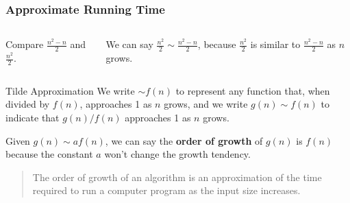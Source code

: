 \documentclass[aspectratio=169, 14pt]{beamer}
\begin{document}
\begin{frame}[fragile]
    \frametitle{Approximate Running Time}

    \begin{columns}
        Compare $\frac{n^2 - n}{2}$ and $\frac{n^2}{2}$.
        
        We can say \alert{$\frac{n^2}{2} \sim \frac{n^2 - n}{2}$}, because $\frac{n^2}{2}$ is similar to $\frac{n^2 - n}{2}$ as $n$ grows. 
    \end{columns}
\end{frame}

\begin{frame}[fragile]
\begin{exampleblock}{Tilde Approximation}
    We write $\sim f(n)$ to represent any function that, when divided by $f(n)$, approaches 1 as $n$ grows, and we write $g(n) \sim f(n)$ to indicate that $g(n)/f(n)$ approaches 1 as $n$ grows.
\end{exampleblock}    
\pause
Given $g(n)\sim af(n)$, we can say the \textbf{order of growth} of $g(n)$ is $f(n)$ because the constant $a$ won't change the growth tendency.
\end{frame}

\begin{frame}
\begin{quote}
    The \alert{order of growth} of an algorithm is an approximation of the time required to run a computer program as the input size increases.
\end{quote}
    

\end{frame}
\end{document}
